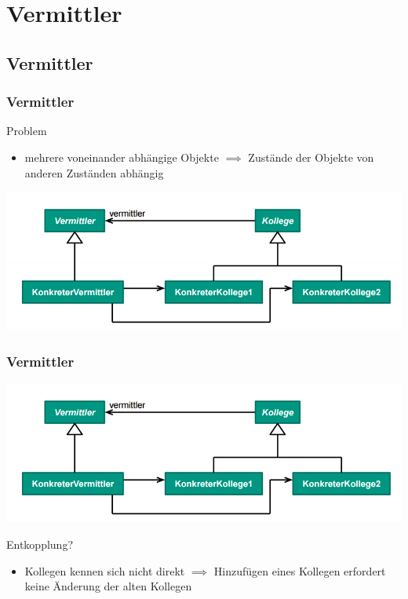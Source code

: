 \documentclass[18pt]{beamer}
\begin{document}
\section{Vermittler}
	\subsection{Vermittler}
		\begin{frame}
		\frametitle{Vermittler}
		\begin{block}{Problem}
			\begin{itemize}
				\item mehrere voneinander abhängige Objekte \linebreak \pause $\implies$ Zustände der Objekte von anderen Zuständen abhängig
			\end{itemize}
		\end{block}
		\pause
		\centering
		\includegraphics[scale=0.45]{./pics/tut3/med.png}
	\end{frame}

	\begin{frame}
		\frametitle{Vermittler}
		\centering
		\includegraphics[scale=0.45]{./pics/tut3/med.png}
		\begin{block}{Entkopplung?}
			\begin{itemize}
				\pause 
				\item Kollegen kennen sich nicht direkt  \linebreak \pause $\implies$ Hinzufügen eines Kollegen erfordert keine Änderung der alten Kollegen
			\end{itemize}
		\end{block}
	\end{frame}
\end{document}
